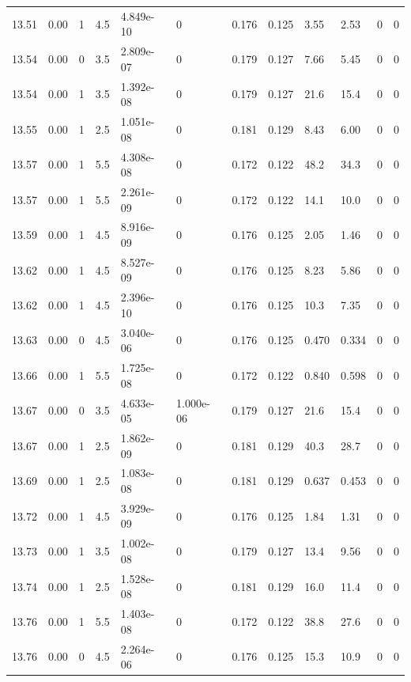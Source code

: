 \documentclass[preview]{standalone}
\begin{document}
{{{{{{{{{{{{{\begin{tabular}{L{1.2cm}C{1.2cm} C{0.3cm}C{0.5cm} C{1.4cm}C{1.4cm} C{1.4cm}C{1.4cm} C{1.6cm}C{1.6cm} C{1.6cm}C{1.6cm}}
  13.51  &  0.00  & 1     & 4.5 &  4.849e-10  & 0  &  0.176&   0.125& 3.55 & 2.53   &  0 & 0  \\ 
  13.54  &  0.00  & 0     & 3.5 &  2.809e-07  & 0  &  0.179&   0.127& 7.66 & 5.45   &  0 & 0  \\ 
  13.54  &  0.00  & 1     & 3.5 &  1.392e-08  & 0  &  0.179&   0.127& 21.6 & 15.4   &  0 & 0  \\ 
  13.55  &  0.00  & 1     & 2.5 &  1.051e-08  & 0  &  0.181&   0.129& 8.43 & 6.00   &  0 & 0  \\ 
  13.57  &  0.00  & 1     & 5.5 &  4.308e-08  & 0  &  0.172&   0.122& 48.2 & 34.3   &  0 & 0  \\ 
  13.57  &  0.00  & 1     & 5.5 &  2.261e-09  & 0  &  0.172&   0.122& 14.1 & 10.0   &  0 & 0  \\ 
  13.59  &  0.00  & 1     & 4.5 &  8.916e-09  & 0  &  0.176&   0.125& 2.05 & 1.46   &  0 & 0  \\ 
  13.62  &  0.00  & 1     & 4.5 &  8.527e-09  & 0  &  0.176&   0.125& 8.23 & 5.86   &  0 & 0  \\ 
  13.62  &  0.00  & 1     & 4.5 &  2.396e-10  & 0  &  0.176&   0.125& 10.3 & 7.35   &  0 & 0  \\ 
  13.63  &  0.00  & 0     & 4.5 &  3.040e-06  & 0  &  0.176&   0.125& 0.470 & 0.334   &  0 & 0  \\ 
  13.66  &  0.00  & 1     & 5.5 &  1.725e-08  & 0  &  0.172&   0.122& 0.840 & 0.598   &  0 & 0  \\ 
  13.67  &  0.00  & 0     & 3.5 &  4.633e-05  & 1.000e-06  &  0.179&   0.127& 21.6 & 15.4   &  0 & 0  \\ 
  13.67  &  0.00  & 1     & 2.5 &  1.862e-09  & 0  &  0.181&   0.129& 40.3 & 28.7   &  0 & 0  \\ 
  13.69  &  0.00  & 1     & 2.5 &  1.083e-08  & 0  &  0.181&   0.129& 0.637 & 0.453   &  0 & 0  \\ 
  13.72  &  0.00  & 1     & 4.5 &  3.929e-09  & 0  &  0.176&   0.125& 1.84 & 1.31   &  0 & 0  \\ 
  13.73  &  0.00  & 1     & 3.5 &  1.002e-08  & 0  &  0.179&   0.127& 13.4 & 9.56   &  0 & 0  \\ 
  13.74  &  0.00  & 1     & 2.5 &  1.528e-08  & 0  &  0.181&   0.129& 16.0 & 11.4   &  0 & 0  \\ 
  13.76  &  0.00  & 1     & 5.5 &  1.403e-08  & 0  &  0.172&   0.122& 38.8 & 27.6   &  0 & 0  \\ 
  13.76  &  0.00  & 0     & 4.5 &  2.264e-06  & 0  &  0.176&   0.125& 15.3 & 10.9   &  0 & 0  \\ 

\end{tabular}}}}}}}}}}}}}}
\end{document}
